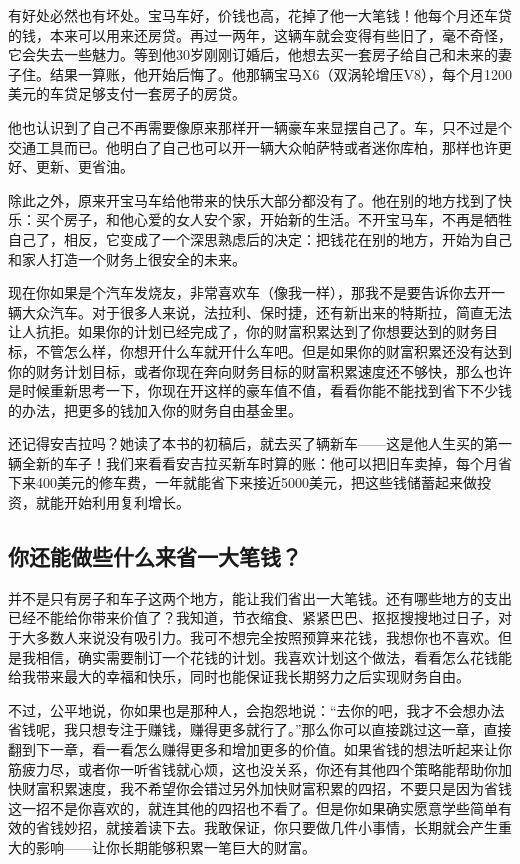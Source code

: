 有好处必然也有坏处。宝马车好，价钱也高，花掉了他一大笔钱！他每个月还车贷的钱，本来可以用来还房贷。再过一两年，这辆车就会变得有些旧了，毫不奇怪，它会失去一些魅力。等到他30岁刚刚订婚后，他想去买一套房子给自己和未来的妻子住。结果一算账，他开始后悔了。他那辆宝马X6（双涡轮增压V8），每个月1200美元的车贷足够支付一套房子的房贷。

他也认识到了自己不再需要像原来那样开一辆豪车来显摆自己了。车，只不过是个交通工具而已。他明白了自己也可以开一辆大众帕萨特或者迷你库柏，那样也许更好、更新、更省油。

除此之外，原来开宝马车给他带来的快乐大部分都没有了。他在别的地方找到了快乐：买个房子，和他心爱的女人安个家，开始新的生活。不开宝马车，不再是牺牲自己了，相反，它变成了一个深思熟虑后的决定：把钱花在别的地方，开始为自己和家人打造一个财务上很安全的未来。

现在你如果是个汽车发烧友，非常喜欢车（像我一样），那我不是要告诉你去开一辆大众汽车。对于很多人来说，法拉利、保时捷，还有新出来的特斯拉，简直无法让人抗拒。如果你的计划已经完成了，你的财富积累达到了你想要达到的财务目标，不管怎么样，你想开什么车就开什么车吧。但是如果你的财富积累还没有达到你的财务计划目标，或者你现在奔向财务目标的财富积累速度还不够快，那么也许是时候重新思考一下，你现在开这样的豪车值不值，看看你能不能找到省下不少钱的办法，把更多的钱加入你的财务自由基金里。

还记得安吉拉吗？她读了本书的初稿后，就去买了辆新车——这是他人生买的第一辆全新的车子！我们来看看安吉拉买新车时算的账：他可以把旧车卖掉，每个月省下来400美元的修车费，一年就能省下来接近5000美元，把这些钱储蓄起来做投资，就能开始利用复利增长。

\subsection{你还能做些什么来省一大笔钱？}

并不是只有房子和车子这两个地方，能让我们省出一大笔钱。还有哪些地方的支出已经不能给你带来价值了？我知道，节衣缩食、紧紧巴巴、抠抠搜搜地过日子，对于大多数人来说没有吸引力。我可不想完全按照预算来花钱，我想你也不喜欢。但是我相信，确实需要制订一个花钱的计划。我喜欢计划这个做法，看看怎么花钱能给我带来最大的幸福和快乐，同时也能保证我长期努力之后实现财务自由。

不过，公平地说，你如果也是那种人，会抱怨地说：“去你的吧，我才不会想办法省钱呢，我只想专注于赚钱，赚得更多就行了。”那么你可以直接跳过这一章，直接翻到下一章，看一看怎么赚得更多和增加更多的价值。如果省钱的想法听起来让你筋疲力尽，或者你一听省钱就心烦，这也没关系，你还有其他四个策略能帮助你加快财富积累速度，我不希望你会错过另外加快财富积累的四招，不要只是因为省钱这一招不是你喜欢的，就连其他的四招也不看了。但是你如果确实愿意学些简单有效的省钱妙招，就接着读下去。我敢保证，你只要做几件小事情，长期就会产生重大的影响——让你长期能够积累一笔巨大的财富。


